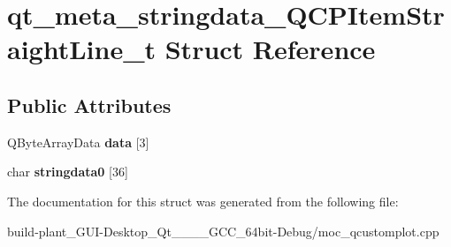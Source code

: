 \hypertarget{structqt__meta__stringdata__QCPItemStraightLine__t}{}\section{qt\+\_\+meta\+\_\+stringdata\+\_\+\+Q\+C\+P\+Item\+Straight\+Line\+\_\+t Struct Reference}
\label{structqt__meta__stringdata__QCPItemStraightLine__t}
\subsection*{Public Attributes}
\begin{DoxyCompactItemize}
\item 
\mbox{\label{structqt__meta__stringdata__QCPItemStraightLine__t_a1b24e360df4ab7c0917a94969f909ba0}} 
Q\+Byte\+Array\+Data {\bfseries data} \mbox{[}3\mbox{]}
\item 
\mbox{\label{structqt__meta__stringdata__QCPItemStraightLine__t_a0e2c6dce44cbc1e13041b33cd138f25d}} 
char {\bfseries stringdata0} \mbox{[}36\mbox{]}
\end{DoxyCompactItemize}


The documentation for this struct was generated from the following file\+:\begin{DoxyCompactItemize}
\item 
build-\/plant\+\_\+\+G\+U\+I-\/\+Desktop\+\_\+\+Qt\+\_\+\_\+\_\+\_\+\+G\+C\+C\+\_\+64bit-\/\+Debug/moc\+\_\+qcustomplot.\+cpp\end{DoxyCompactItemize}
